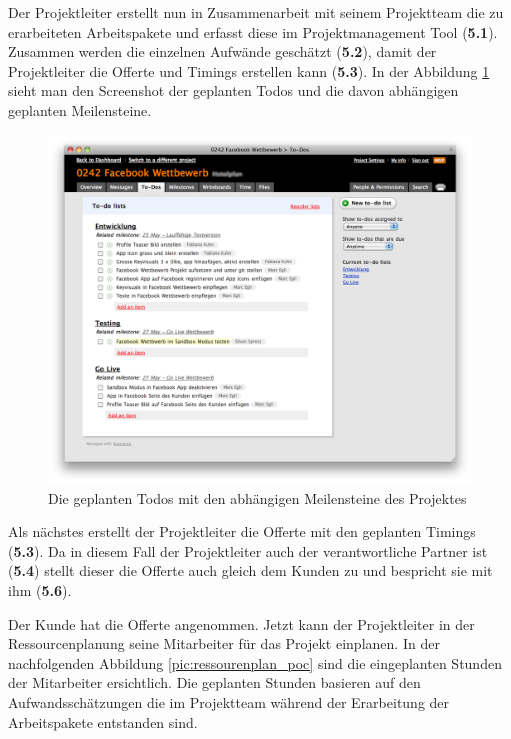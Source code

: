 Der Projektleiter erstellt nun in Zusammenarbeit mit seinem Projektteam die
zu erarbeiteten Arbeitspakete und erfasst diese im Projektmanagement Tool (\textbf{5.1}).
Zusammen werden die einzelnen Aufwände geschätzt (\textbf{5.2}), damit der 
Projektleiter die Offerte und Timings erstellen kann (\textbf{5.3}). In der
Abbildung \ref{pic:todos_poc} sieht man den Screenshot der geplanten Todos und die davon
abhängigen geplanten Meilensteine.

\begin{figure}[htbp]
\begin{center}
\includegraphics[width=1.0\textwidth,angle=0]{./bilder/proof_of_concept/todos_poc.png}
\caption[Die geplanten Todos mit den abhängigen Meilensteine des Projektes]{Die geplanten Todos 
    mit den abhängigen Meilensteine des Projektes\footnotemark}
\label{pic:todos_poc}
\end{center}
\end{figure}

Als nächstes erstellt der Projektleiter die Offerte mit den geplanten Timings
(\textbf{5.3}). Da in diesem Fall der Projektleiter auch der verantwortliche
Partner ist (\textbf{5.4}) stellt dieser die Offerte auch gleich dem Kunden zu und bespricht
sie mit ihm (\textbf{5.6}).

Der Kunde hat die Offerte angenommen. Jetzt kann der Projektleiter in der 
Ressourcenplanung seine Mitarbeiter für das Projekt einplanen. In der nachfolgenden
Abbildung \ref{pic:ressourenplan_poc} sind die eingeplanten Stunden der Mitarbeiter
ersichtlich. Die geplanten Stunden basieren auf den Aufwandsschätzungen die im
Projektteam während der Erarbeitung der Arbeitspakete entstanden sind.

